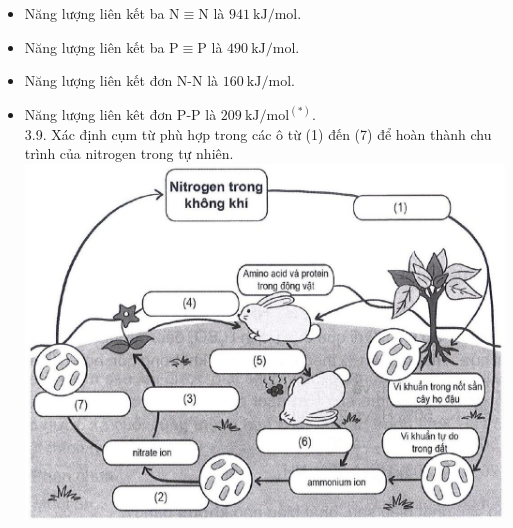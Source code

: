 \documentclass[10pt]{article}
\begin{document}
\begin{itemize}
  \item Năng lượng liên kết ba $\mathrm{N} \equiv \mathrm{N}$ là $941 \mathrm{~kJ} / \mathrm{mol}$.
  \item Năng lượng liên kết ba $\mathrm{P} \equiv \mathrm{P}$ là $490 \mathrm{~kJ} / \mathrm{mol}$.
  \item Năng lượng liên kết đơn N-N là $160 \mathrm{~kJ} / \mathrm{mol}$.
  \item Năng lượng liên kêt đơn P-P là $209 \mathrm{~kJ} / \mathrm{mol}^{(*)}$.\\
3.9. Xác định cụm từ phù hợp trong các ô từ (1) đến (7) để hoàn thành chu trình của nitrogen trong tự nhiên.\\
\includegraphics[max width=\textwidth, center]{2025_10_23_ae7aef68fb3b41082d29g-06}
\end{itemize}
\end{document}
